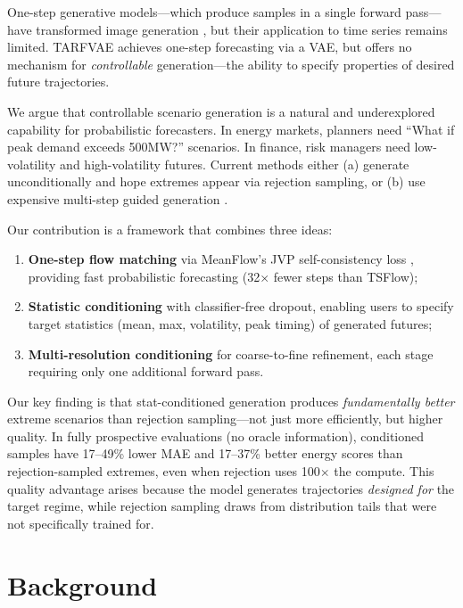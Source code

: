 \documentclass{article}
\begin{document}
One-step generative models---which produce samples in a single forward pass---have transformed image generation \citep{geng2025meanflow, frans2025shortcut, song2023consistency}, but their application to time series remains limited. TARFVAE \citep{tarfvae2025} achieves one-step forecasting via a VAE, but offers no mechanism for \emph{controllable} generation---the ability to specify properties of desired future trajectories.

We argue that controllable scenario generation is a natural and underexplored capability for probabilistic forecasters. In energy markets, planners need ``What if peak demand exceeds 500MW?'' scenarios. In finance, risk managers need low-volatility and high-volatility futures. Current methods either (a) generate unconditionally and hope extremes appear via rejection sampling, or (b) use expensive multi-step guided generation \citep{kollovieh2024mrdiff, nsdiff2025}.

Our contribution is a framework that combines three ideas:
\begin{enumerate}
    \item \textbf{One-step flow matching} via MeanFlow's JVP self-consistency loss \citep{geng2025meanflow}, providing fast probabilistic forecasting (32$\times$ fewer steps than TSFlow);
    \item \textbf{Statistic conditioning} with classifier-free dropout, enabling users to specify target statistics (mean, max, volatility, peak timing) of generated futures;
    \item \textbf{Multi-resolution conditioning} for coarse-to-fine refinement, each stage requiring only one additional forward pass.
\end{enumerate}

Our key finding is that stat-conditioned generation produces \emph{fundamentally better} extreme scenarios than rejection sampling---not just more efficiently, but higher quality. In fully prospective evaluations (no oracle information), conditioned samples have 17--49\% lower MAE and 17--37\% better energy scores than rejection-sampled extremes, even when rejection uses 100$\times$ the compute. This quality advantage arises because the model generates trajectories \emph{designed for} the target regime, while rejection sampling draws from distribution tails that were not specifically trained for.

\section{Background}
\end{document}
